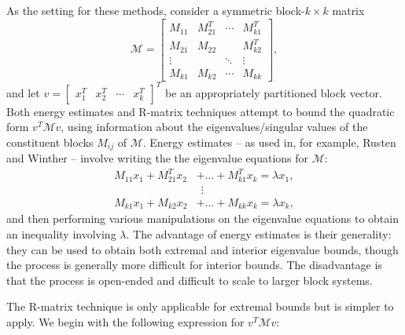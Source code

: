 \documentclass{article}
\begin{document}
As the setting for these methods, consider a symmetric block-$k \times k$ matrix
$$
\mathcal{M} = \begin{bmatrix}
	M_{11} & M_{21}^T &  \cdots & M_{k1}^T \\
	M_{21} & M_{22} & & M_{k2}^T\\
	\vdots & & \ddots &  \vdots \\
	M_{k1} & M_{k2} & \cdots  & M_{kk}
\end{bmatrix},
$$
and let $v = \begin{bmatrix} x_1^T & x_2^T & \cdots & x_k^T \end{bmatrix}^T$ be an appropriately partitioned block vector. Both  energy estimates and R-matrix techniques attempt to bound the quadratic form  $v^T \mathcal{M} v$, using information about the eigenvalues/singular values of the constituent blocks $M_{ij}$ of $\mathcal{M}$. Energy estimates -- as used in, for example, Rusten and Winther \cite{rw92} -- involve writing the the eigenvalue equations for $\mathcal{M}$:
\begin{align*}
	M_{11}x_1 + M_{21}^T x_2 &+ \ldots + M_{k1}^T x_k = \lambda x_1 ,\\
	&\ \ \vdots \\
	M_{k1}x_1 + M_{k2} x_2 &+ \ldots + M_{kk} x_k = \lambda x_k,
\end{align*}
and then performing various manipulations on the eigenvalue equations to obtain an inequality involving $\lambda$. The advantage of energy estimates is their generality: they can be used to obtain both extremal and interior eigenvalue bounds, though the process is generally more difficult for interior bounds. The disadvantage is that the process is open-ended and difficult to scale to larger block systems.

The R-matrix technique is only applicable for extremal bounds but is simpler to apply. We begin with the following expression for $v^T \mathcal{M} v$:
\end{document}
